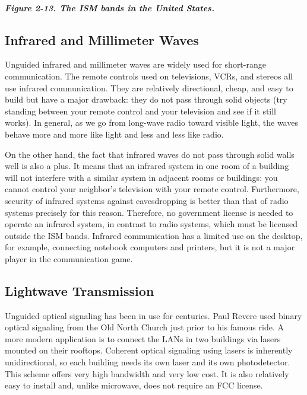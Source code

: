 \documentclass[b5paper,11pt]{memoir}
\begin{document}
\subparagraph[Figure 2-13. The ISM bands in the United
States.]{\texorpdfstring{\protect\hypertarget{0130661023_ch02lev1sec3.htmlux5cux23ch02fig13}{}{}Figure
2-13. The ISM bands in the United
States.}{Figure 2-13. The ISM bands in the United States.}}


\protect\hypertarget{0130661023_ch02lev1sec3.htmlux5cux23ch02lev2sec11}{}{}

\subsection{Infrared and Millimeter Waves}

Unguided infrared and millimeter waves are widely used for short-range
communication. The remote controls used on televisions, VCRs, and
stereos all use infrared communication. They are relatively directional,
cheap, and easy to build but have a major drawback: they do not pass
through solid objects (try standing between your remote control and your
television and see if it still works). In general, as we go from
long-wave radio toward visible light, the waves behave more and more
like light and less and less like radio.

On the other hand, the fact that infrared waves do not pass through
solid walls well is also a plus. It means that an infrared system in one
room of a building will not interfere with a similar system in adjacent
rooms or buildings: you cannot control your neighbor's television with
your remote control. Furthermore, security of infrared systems against
eavesdropping is better than that of radio systems precisely for this
reason. Therefore, no government license is needed to operate an
infrared system, in contrast to radio systems, which must be licensed
outside the ISM bands. Infrared communication has a limited use on the
desktop, for example, connecting notebook computers and printers, but it
is not a major player in the communication game.

\protect\hypertarget{0130661023_ch02lev1sec3.htmlux5cux23ch02lev2sec12}{}{}

\subsection{Lightwave Transmission}

Unguided optical signaling has been in use for centuries. Paul Revere
used binary optical signaling from the Old North Church just prior to
his famous ride. A more modern application is to connect the LANs in two
buildings via lasers mounted on their rooftops. Coherent optical
signaling using lasers is inherently unidirectional, so each building
needs its own laser and its own photodetector. This scheme offers very
high bandwidth and very low cost. It is also relatively easy to install
and, unlike microwave, does not require an FCC license.
\end{document}
